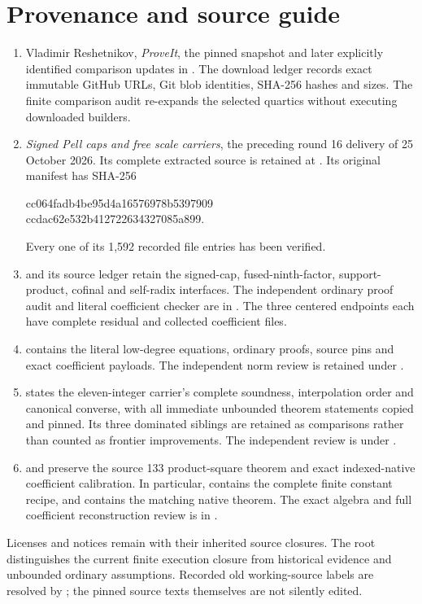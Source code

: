\documentclass[11pt]{article}
\begin{document}
\section{Provenance and source guide}
\begin{enumerate}
\item Vladimir Reshetnikov, \emph{ProveIt}, the pinned snapshot and later
explicitly identified comparison updates in .
The download ledger records exact immutable GitHub URLs, Git blob identities,
SHA-256 hashes and sizes. The finite comparison audit re-expands the selected
quartics without executing downloaded builders.
\item \emph{Signed Pell caps and free scale carriers}, the preceding
round 16 delivery of 25 October 2026. Its complete extracted source is retained
at . Its original manifest has SHA-256
\begin{center}\small\ttfamily
cc064fadb4be95d4a16576978b5397909\\
ccdac62e532b412722634327085a899.
\end{center}
Every one of its 1,592 recorded file entries has been verified.
\item {} and its source ledger retain the signed-cap,
fused-ninth-factor, support-product, cofinal and self-radix interfaces.
The independent ordinary proof audit and literal coefficient checker are
in . The three centered endpoints each have complete
residual and collected coefficient files.
\item {} contains the literal low-degree equations,
ordinary proofs, source pins and exact coefficient payloads.
The independent norm review is retained under .
\item {} states the eleven-integer carrier's complete
soundness, interpolation order and canonical converse, with all immediate
unbounded theorem statements copied and pinned. Its three dominated siblings
are retained as comparisons rather than counted as frontier improvements.
The independent review is under .
\item {} and  preserve the
source 133 product-square theorem and exact indexed-native coefficient
calibration. In particular,
contains the complete finite constant recipe, and
contains the matching native theorem. The exact algebra and full coefficient
reconstruction review is in .
\end{enumerate}
Licenses and notices remain with their inherited source closures. The root
 distinguishes the current finite execution closure
from historical evidence and unbounded ordinary assumptions. Recorded old
working-source labels are resolved by ;
the pinned source texts themselves are not silently edited.
\end{document}
